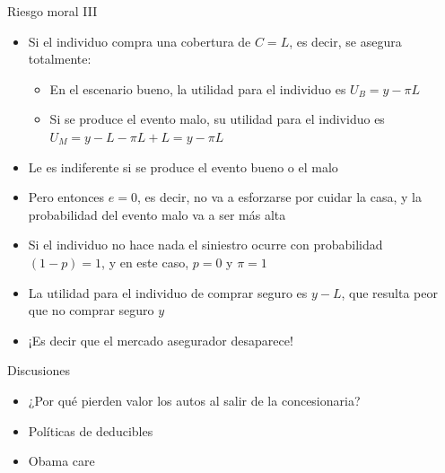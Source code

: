 \documentclass{beamer}
\begin{document}
\begin{frame}{Riesgo moral III}
    \begin{itemize}
    \item Si el individuo compra una cobertura de $C=L$, es decir, se asegura totalmente:
    \begin{itemize}
    \item En el escenario bueno, la utilidad para el individuo es 
    $U_B = y - \pi L$
    \item Si se produce el evento malo, su utilidad para el individuo es 
    $U_M = y - L - \pi L + L = y - \pi L$ 
    \end{itemize}
    \item Le es indiferente si se produce el evento bueno o el malo 
    \item Pero entonces $e=0$, es decir, no va a esforzarse por cuidar la casa, y la probabilidad del evento malo va a ser más alta \vspace{2mm}
    \item Si el individuo no hace nada el siniestro ocurre con probabilidad $(1-p)=1$, y en este caso, $p=0$ y $\pi=1$
    \item La utilidad para el individuo de comprar seguro es $y-L$, que resulta peor que no comprar seguro $y$
    \item ¡Es decir que el mercado asegurador desaparece! 
  \end{itemize}   
\end{frame}


\begin{frame}{Discusiones}
    \begin{itemize}
        \item ¿Por qué pierden valor los autos al salir de la concesionaria? \vspace{1mm}
        \item Políticas de deducibles \vspace{1mm}
        \item Obama care
    \end{itemize}
\end{frame}
\end{document}
